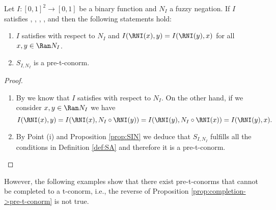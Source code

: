 \begin{corollary}\label{cor:SINisapre-t-conorm} Let $I:[0,1]^2 \to [0,1]$ be a binary function and $N_I$ a fuzzy negation.  If $I$ satisfies \Ione, \Itwo, \EP, \NP, \Rone and \Rtwo then the following statements hold:
	\begin{enumerate}[label=(\roman*)]
		\item $I$ satisfies \RCPN with respect to $N_I$ and $I(\RNI(x),y)=I(\RNI(y),x)$ for all $x,y \in \Ran N_I$.
		\item $S_{I,N_I}$ is a pre-t-conorm.
	\end{enumerate}
\end{corollary}
\begin{proof}\hspace{0.5cm}
	\begin{enumerate}[label=(\roman*)]
		\item By \cite[Lemma 1.5.22]{Baczynski2008} we know that $I$ satisfies \RCPN with respect to $N_I$. On the other hand, if we consider $x,y \in \Ran N_I$ we have
		$$I(\RNI(x),y)=I(\RNI(x),N_I \circ \RNI (y))=I(\RNI(y),N_I \circ \RNI(x)) =I(\RNI(y),x).$$
		\item By Point (i) and Proposition \ref{prop:SIN} we deduce that $S_{I,N_{I}}$ fulfills all the conditions in Definition \ref{def:SA} and therefore it is a pre-t-conorm.
	\end{enumerate}
\end{proof}


However, the following examples show that there exist pre-t-conorms that cannot be completed to a t-conorm, i.e., the reverse of Proposition \ref{prop:completion->pre-t-conorm} is not true.


